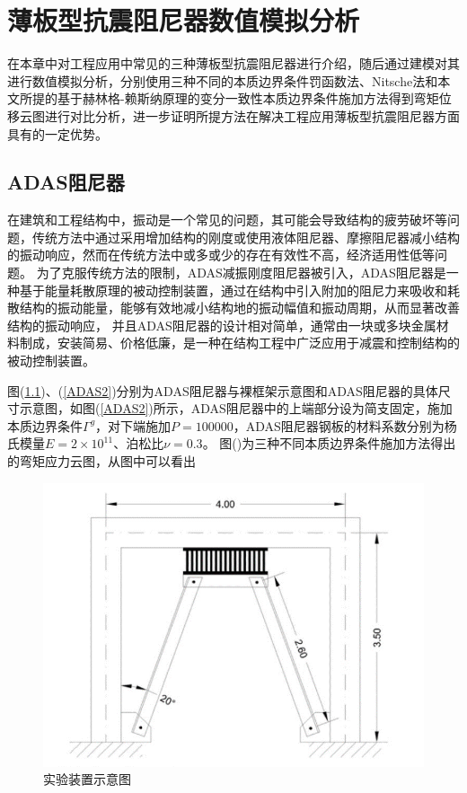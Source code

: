 \chapter{薄板型抗震阻尼器数值模拟分析}
在本章中对工程应用中常见的三种薄板型抗震阻尼器进行介绍，随后通过建模对其进行数值模拟分析，分别使用三种不同的本质边界条件罚函数法、Nitsche法和本文所提的基于赫林格-赖斯纳原理的变分一致性本质边界条件施加方法得到弯矩位移云图进行对比分析，进一步证明所提方法在解决工程应用薄板型抗震阻尼器方面具有的一定优势。
\section{ADAS阻尼器}
在建筑和工程结构中，振动是一个常见的问题，其可能会导致结构的疲劳破坏等问题，传统方法中通过采用增加结构的刚度或使用液体阻尼器、摩擦阻尼器减小结构的振动响应，然而在传统方法中或多或少的存在有效性不高，经济适用性低等问题。
为了克服传统方法的限制，ADAS减振刚度阻尼器被引入，ADAS阻尼器是一种基于能量耗散原理的被动控制装置，通过在结构中引入附加的阻尼力来吸收和耗散结构的振动能量，能够有效地减小结构地的振动幅值和振动周期，从而显著改善结构的振动响应，
并且ADAS阻尼器的设计相对简单，通常由一块或多块金属材料制成，安装简易、价格低廉，是一种在结构工程中广泛应用于减震和控制结构的被动控制装置。\par
图(\ref{ADAS1})、(\ref{ADAS2})分别为ADAS阻尼器与裸框架示意图和ADAS阻尼器的具体尺寸示意图，如图(\ref{ADAS2})所示，ADAS阻尼器中的上端部分设为简支固定，施加本质边界条件$\Gamma^g$，对下端施加$P=100000$，ADAS阻尼器钢板的材料系数分别为杨氏模量$E=2\times 10^{11}$、泊松比$\nu=0.3$。
图()为三种不同本质边界条件施加方法得出的弯矩应力云图，从图中可以看出
\begin{figure}[H]
    \centering
    \includegraphics[scale=0.6]{figure/DAMPER/ADAS/1.png}
    \caption{实验装置示意图\cite{basu2016}}\label{ADAS1}
\end{figure}
